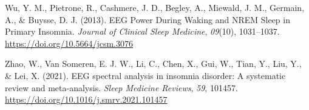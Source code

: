 \documentclass[
]{article}
\newlength{\cslhangindent}
\newenvironment{CSLReferences}[2] %
 {\begin{list}{}{%
  \setlength{\itemindent}{0pt}
  \setlength{\leftmargin}{0pt}
  \setlength{\parsep}{0pt}
  \ifodd #1
   \setlength{\leftmargin}{\cslhangindent}
   \setlength{\itemindent}{-1\cslhangindent}
  \fi
  \setlength{\itemsep}{#2\baselineskip}}}
 {\end{list}}
\begin{document}
\begin{CSLReferences}{1}{0}
Wu, Y. M., Pietrone, R., Cashmere, J. D., Begley, A., Miewald, J. M.,
Germain, A., \& Buysse, D. J. (2013). {EEG Power During Waking} and
{NREM Sleep} in {Primary Insomnia}. \emph{Journal of Clinical Sleep
Medicine}, \emph{09}(10), 1031--1037.
\url{https://doi.org/10.5664/jcsm.3076}

Zhao, W., Van Someren, E. J. W., Li, C., Chen, X., Gui, W., Tian, Y.,
Liu, Y., \& Lei, X. (2021). {EEG} spectral analysis in insomnia
disorder: {A} systematic review and meta-analysis. \emph{Sleep Medicine
Reviews}, \emph{59}, 101457.
\url{https://doi.org/10.1016/j.smrv.2021.101457}

\end{CSLReferences}
\end{document}
